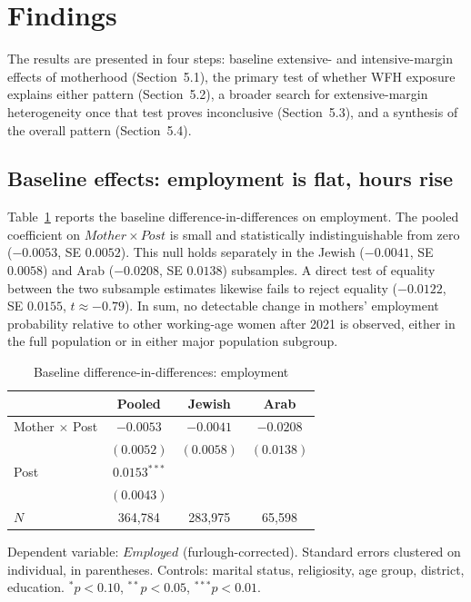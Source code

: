 \documentclass[11pt]{article}
\begin{document}
\section{Findings}

The results are presented in four steps: baseline extensive- and intensive-margin effects of motherhood (Section~5.1), the primary test of whether WFH exposure explains either pattern (Section~5.2), a broader search for extensive-margin heterogeneity once that test proves inconclusive (Section~5.3), and a synthesis of the overall pattern (Section~5.4).

\subsection{Baseline effects: employment is flat, hours rise}

Table~\ref{tab:baseline} reports the baseline difference-in-differences on employment. The pooled coefficient on $Mother\times Post$ is small and statistically indistinguishable from zero ($-0.0053$, SE $0.0052$). This null holds separately in the Jewish ($-0.0041$, SE $0.0058$) and Arab ($-0.0208$, SE $0.0138$) subsamples. A direct test of equality between the two subsample estimates likewise fails to reject equality ($-0.0122$, SE $0.0155$, $t\approx-0.79$). In sum, no detectable change in mothers' employment probability relative to other working-age women after 2021 is observed, either in the full population or in either major population subgroup.

\begin{table}[htbp]
\centering
\caption{Baseline difference-in-differences: employment}
\label{tab:baseline}
\begin{tabular}{lccc}
\hline
 & Pooled & Jewish & Arab \\
\hline
Mother $\times$ Post & $-0.0053$ & $-0.0041$ & $-0.0208$ \\
 & $(0.0052)$ & $(0.0058)$ & $(0.0138)$ \\
Post & $0.0153^{***}$ & & \\
 & $(0.0043)$ & & \\
\hline
$N$ & 364{,}784 & 283{,}975 & 65{,}598 \\
\hline
\end{tabular}
\par\smallskip
{\footnotesize Dependent variable: $Employed$ (furlough-corrected). Standard errors clustered on individual, in parentheses. Controls: marital status, religiosity, age group, district, education. $^{*}p<0.10$, $^{**}p<0.05$, $^{***}p<0.01$.}
\end{table}
\end{document}
